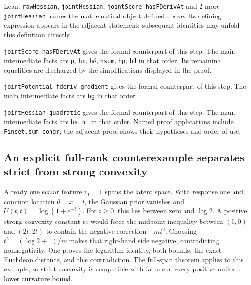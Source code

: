 \documentclass[11pt,a4paper]{report}
\begin{document}
\begin{leanbox}{Lean: \texttt{rawHessian}, \texttt{jointHessian}, \texttt{jointScore\_\allowbreak{}hasFDerivAt} and 2 more}
\texttt{joint\allowbreak{}Hessian} names the mathematical object defined above. Its defining expression appears in the adjacent statement; subsequent identities may unfold this definition directly.




\texttt{joint\allowbreak{}Score\_\allowbreak{}has\allowbreak{}FDeriv\allowbreak{}At} gives the formal counterpart of this step. The main intermediate facts are \texttt{p}, \texttt{hx}, \texttt{h\ensuremath{\theta}}, \texttt{hsum}, \texttt{hp}, \texttt{hd} in that order. Its remaining equalities are discharged by the simplifications displayed in the proof.




\texttt{joint\allowbreak{}Potential\_\allowbreak{}fderiv\_\allowbreak{}gradient} gives the formal counterpart of this step. The main intermediate facts are \texttt{hg} in that order.




\texttt{joint\allowbreak{}Hessian\_\allowbreak{}quadratic} gives the formal counterpart of this step. The main intermediate facts are \texttt{hs}, \texttt{hi} in that order. Named proof applications include \texttt{Finset.\allowbreak{}sum\_\allowbreak{}congr}; the adjacent proof shows their hypotheses and order of use.
\end{leanbox}
\subsection{\texorpdfstring{An explicit full-rank counterexample separates strict from strong convexity}{An explicit full-rank counterexample separates strict from strong convexity}}
\label{report-step-KIPLMC-LogisticExample-lean-8}


Already one scalar feature \(v_1=1\) spans the latent space. With response one and common location \(\theta=x=t\), the Gaussian prior vanishes and \(U(t,t)=\log(1+e^{-t})\). For \(t\ge0\), this lies between zero and \(\log2\). A positive strong-convexity constant \(m\) would force the midpoint inequality between \((0,0)\) and \((2t,2t)\) to contain the negative correction \(-mt^2\). Choosing \(t^2=(\log2+1)/m\) makes that right-hand side negative, contradicting nonnegativity. One proves the logarithm identity, both bounds, the exact Euclidean distance, and this contradiction. The full-span theorem applies to this example, so strict convexity is compatible with failure of every positive uniform lower curvature bound.
\end{document}
